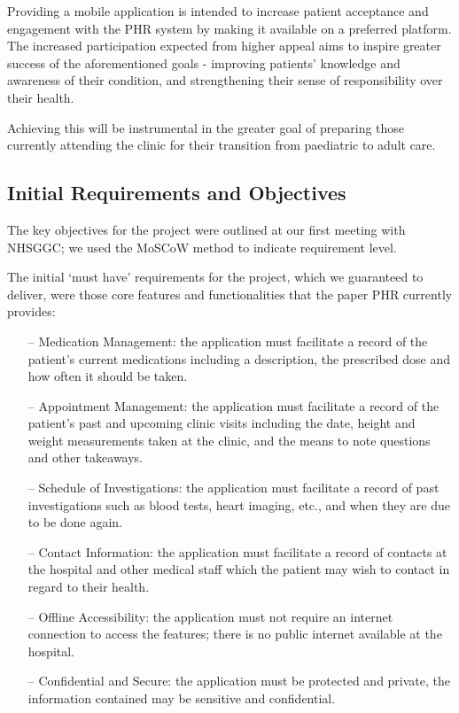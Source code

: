 \documentclass{l3proj}
\begin{document}
Providing a mobile application is intended to increase patient acceptance and engagement with the PHR system by making it available on a preferred platform. The increased participation expected from higher appeal aims to inspire greater success of the aforementioned goals - improving patients' knowledge and awareness of their condition, and strengthening their sense of responsibility over their health.

Achieving this will be instrumental in the greater goal of preparing those currently attending the clinic for their transition from paediatric to adult care.


\subsection{Initial Requirements and Objectives}\label {sec:2.3}
The key objectives for the project were outlined at our first meeting with NHSGGC; we used the MoSCoW method \cite{MoSCoW} to indicate requirement level.

The initial `must have' requirements for the project, which we guaranteed to deliver, were those core features and functionalities that the paper PHR currently provides:

\begin{itemize}
\item[--]Medication Management: the application must facilitate a record of the patient's current medications including a description, the prescribed dose and how often it should be taken.

\item[--]Appointment Management: the application must facilitate a record of the patient's past and upcoming clinic visits including the date, height and weight measurements taken at the clinic, and the means to note questions and other takeaways.

\item[--]Schedule of Investigations: the application must facilitate a record of past investigations such as blood tests, heart imaging, etc., and when they are due to be done again.

\item[--]Contact Information: the application must facilitate a record of contacts at the hospital and other medical staff which the patient may wish to contact in regard to their health.

\item[--]Offline Accessibility: the application must not require an internet connection to access the features; there is no public internet available at the hospital.

\item[--]Confidential and Secure: the application must be protected and private, the information contained may be sensitive and confidential.
\end{itemize}
\end{document}
